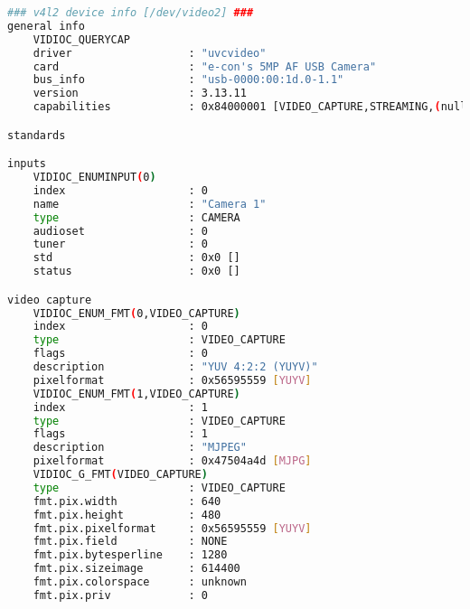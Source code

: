 \documentclass{article}
\begin{document}
\begin{lstlisting}[language=sh,breaklines]
### v4l2 device info [/dev/video2] ###
general info
    VIDIOC_QUERYCAP
	driver                  : "uvcvideo"
	card                    : "e-con's 5MP AF USB Camera"
	bus_info                : "usb-0000:00:1d.0-1.1"
	version                 : 3.13.11
	capabilities            : 0x84000001 [VIDEO_CAPTURE,STREAMING,(null)]

standards

inputs
    VIDIOC_ENUMINPUT(0)
	index                   : 0
	name                    : "Camera 1"
	type                    : CAMERA
	audioset                : 0
	tuner                   : 0
	std                     : 0x0 []
	status                  : 0x0 []

video capture
    VIDIOC_ENUM_FMT(0,VIDEO_CAPTURE)
	index                   : 0
	type                    : VIDEO_CAPTURE
	flags                   : 0
	description             : "YUV 4:2:2 (YUYV)"
	pixelformat             : 0x56595559 [YUYV]
    VIDIOC_ENUM_FMT(1,VIDEO_CAPTURE)
	index                   : 1
	type                    : VIDEO_CAPTURE
	flags                   : 1
	description             : "MJPEG"
	pixelformat             : 0x47504a4d [MJPG]
    VIDIOC_G_FMT(VIDEO_CAPTURE)
	type                    : VIDEO_CAPTURE
	fmt.pix.width           : 640
	fmt.pix.height          : 480
	fmt.pix.pixelformat     : 0x56595559 [YUYV]
	fmt.pix.field           : NONE
	fmt.pix.bytesperline    : 1280
	fmt.pix.sizeimage       : 614400
	fmt.pix.colorspace      : unknown
	fmt.pix.priv            : 0


\end{lstlisting}
\end{document}
